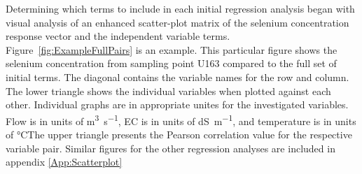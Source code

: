 \begin{linenumbers}
Determining which terms to include in each initial regression analysis began with visual analysis of an enhanced scatter-plot matrix of the selenium concentration response vector and the independent variable terms.  Figure~\ref{fig:ExampleFullPairs} is an example.  This particular figure shows the selenium concentration from sampling point U163 compared to the full set of initial terms.  The diagonal contains the variable names for the row and column.  The lower triangle shows the individual variables when plotted against each other.  Individual graphs are in appropriate unites for the investigated variables.  Flow is in units of \si{\cubic\meter\per\second}, EC is in units of \si{\deci\siemens\per\meter}, and temperature is in units of \si{\degreeCelsius}The upper triangle presents the Pearson correlation value for the respective variable pair.  Similar figures for the other regression analyses are included in appendix \ref{App:Scatterplot}


\end{linenumbers}
